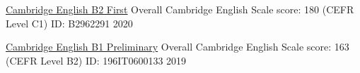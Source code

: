 

\begin{cvhonors}

  \cvhonor
    {\underline{\href{https://www.cambridgeenglish.org/exams-and-tests/first/}{Cambridge English B2 First}}} %
    {Overall Cambridge English Scale score: 180 (CEFR Level C1)} %
    {ID: B2962291} %
    {2020} %

  \cvhonor
    {\underline{\href{https://www.cambridgeenglish.org/exams-and-tests/preliminary/}{Cambridge English B1 Preliminary}}} %
    {Overall Cambridge English Scale score: 163 (CEFR Level B2)} %
    {ID: 196IT0600133} %
    {2019} %

\end{cvhonors}
